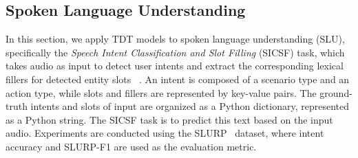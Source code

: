 \documentclass{article}
\begin{document}
\begin{table}[t]
\caption{Speech intent classification and slot filling on SLURP dataset. TDT vs RNNT: Relative speed-up against RNNT.}
\label{tab:slu}
\end{table}

\subsection{Spoken Language Understanding}

In this section, we apply TDT models to spoken language understanding (SLU), specifically the \emph{Speech Intent Classification and Slot Filling} (SICSF) task, which takes audio as input to detect user intents and extract the corresponding lexical fillers for detected entity slots ~\cite{slurp}. An intent is composed of a scenario type and an action type, while slots and fillers are represented by key-value pairs. The ground-truth intents and slots of input are organized as a Python dictionary, represented as a Python string. The SICSF task is to predict this text based on the input audio. Experiments are conducted using the SLURP~\cite{slurp} dataset, where intent accuracy and SLURP-F1 are used as the evaluation metric. 
\end{document}

